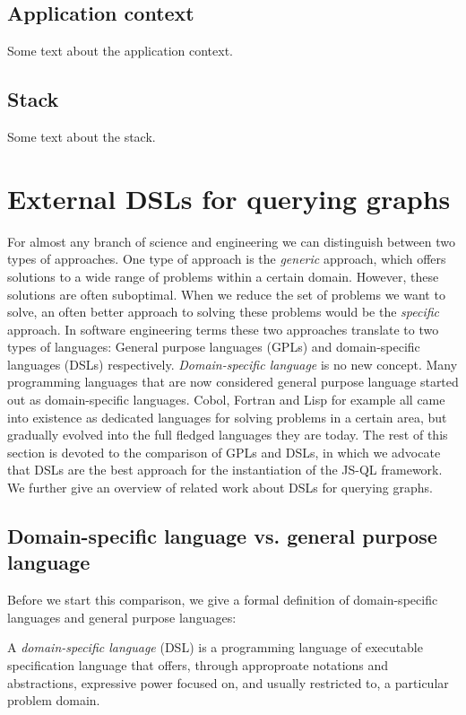\subsection*{Application context}

Some text about the application context.

\subsection*{Stack}

Some text about the stack.





\section{External DSLs for querying graphs}

For almost any branch of science and engineering we can distinguish between two types of approaches. One type of approach is the \textit{generic} approach, which offers solutions to a wide range of problems within a certain domain. However, these solutions are often suboptimal. When we reduce the set of problems we want to solve, an often better approach to solving these problems would be the \textit{specific} approach.
In software engineering terms these two approaches translate to two types of languages: General purpose languages (GPLs) and domain-specific languages (DSLs) respectively. 
\textit{Domain-specific language} is no new concept. Many programming languages that are now considered general purpose language started out as domain-specific languages. Cobol, Fortran and Lisp for example all came into existence as dedicated languages for solving problems in a certain area\cite{vanDeursen:2000}, but gradually evolved into the full fledged languages they are today. The rest of this section is devoted to the comparison of GPLs and DSLs, in which we advocate that DSLs are the best approach for the instantiation of the JS-QL framework. We further give an overview of related work about DSLs for querying graphs.


\subsection{Domain-specific language vs. general purpose language}
\label{subsec:DSLvsGPL}

Before we start this comparison, we give a formal definition of domain-specific languages and general purpose languages:
\begin{definition}
    A \textit{domain-specific language} (DSL) is a programming language of executable specification language that offers, through approproate notations and abstractions, expressive power focused on, and usually restricted to, a particular problem domain.
\end{definition}

